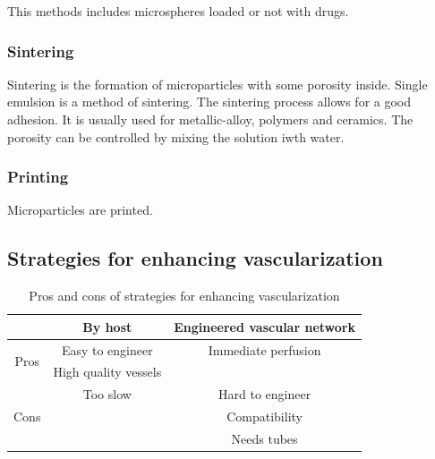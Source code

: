 	This methods includes microspheres loaded or not with drugs.

		\subsubsection{Sintering}
		Sintering is the formation of microparticles with some porosity inside.
		Single emulsion is a method of sintering.
		The sintering process allows for a good adhesion.
		It is usually used for metallic-alloy, polymers and ceramics.
		The porosity can be controlled by mixing the solution iwth water.

		\subsubsection{Printing}
		Microparticles are printed.

	\subsection{Strategies for enhancing vascularization}

	\begin{table}[H]
		\centering
		\begin{tabular}{|c|c|c|}
			\hline
			& By host & Engineered vascular network\\
			\hline
			\multirow{2}{*}{Pros} & Easy to engineer & Immediate perfusion\\
														& High quality vessels &\\
			\hline
			\multirow{3}{*}{Cons} & Too slow & Hard to engineer\\
														& 				 & Compatibility\\
														& 				 & Needs tubes\\
			\hline
		\end{tabular}
		\caption{Pros and cons of strategies for enhancing vascularization}
	\end{table}
